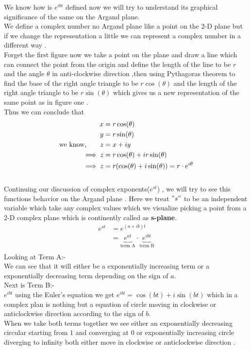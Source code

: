 \documentclass[10pt,twoside]{report}
\begin{document}
We know how is $e^{ibt}$ defined now we will try to understand its graphical significance of the same on the \gls{Argand plane}.\\
We define a complex number no Argand plane like a point on the 2-D plane but if we change the representation a little we can represent a complex number in a different way .\\ Forget the first figure %
now we take a point on the plane and draw a line which can connect the point from the origin and define the length of the line to be $r$ and the angle $\theta$ in anti-clockwise direction ,then using Pythagoras theorem to find the base of the right angle triangle to be $r\cos(\theta)$ and the length of the right angle triangle to be $r\sin(\theta)$ which gives us a new representation of the same point as in figure one .\\ %
Thus we can conclude that 
\begin{align*}
    x &= r\cos(\theta)\\
    y &= r\sin(\theta)\\
    \text{we know,\qquad}z &= x + iy\\
    \implies z &= r\cos(\theta) + ir\sin(\theta)\\
    \implies z &= r (\cos(\theta) + i\sin(\theta)) = r\cdot e^{i\theta}
\end{align*}
\\
Continuing our discussion of complex exponents($e^{st}$) , we will try to see this functions behavior on the Argand plane . Here we treat $"s"$ to be an independent variable which take any complex values which we visualize picking a point from a 2-D complex plane which is continently called as \textbf{s-plane}. %
\begin{align*}
    e^{st} &= e^{(a+ib)t}\\
           &= \underbrace{e^{at}}_\text{term A}\cdot\underbrace{e^{ibt}}_\text{term B} \\
\end{align*}
Looking at Term A:-\\
We can see that it will either be a exponentially increasing term or a exponentially decreasing term depending on the sign of $a$.\\
Next is Term B:-\\
$e^{ibt}$ using the Euler's equation we get $e^{ibt} = \cos(bt) +i\sin(bt)$ which in a complex plan is nothing but a equation of circle moving in clockwise or anticlockwise direction according to the sign of $b$.\\
When we take both terms together we see either an exponentially decreasing circular starting from $1$ and converging at $0$ or exponentially increasing circle diverging to infinity both either move in clockwise or anticlockwise direction .
\end{document}
